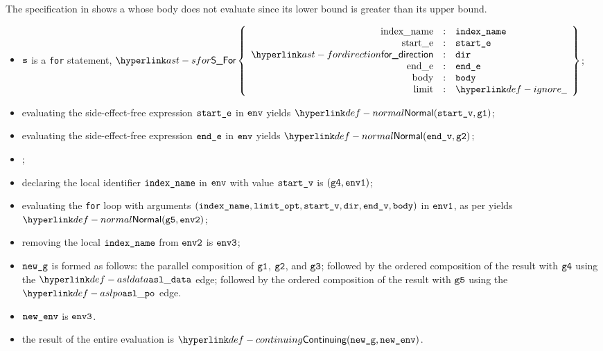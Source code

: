 The specification in  shows a \forstatementterm{}
whose body does not evaluate since its lower bound is greater than its upper bound.

\ProseParagraph
\AllApply
\begin{itemize}
  \item $\texttt{s}$ is a \texttt{for} statement, $\SFor\left\{\begin{array}{rcl}
    \Forindexname &:& \vindexname\\
    \Forstarte &:& \vstarte\\
    \fordirection &:& \vdir\\
    \Forende &:& \vende\\
    \Forbody &:& \vbody\\
    \Forlimit &:& \Ignore
  \end{array}\right\}$;
  \item evaluating the side-effect-free expression $\texttt{start\_e}$ in $\env$ yields
        $\Normal(\vstartv, \vgone)$\ProseOrError;
  \item evaluating the side-effect-free expression $\texttt{end\_e}$ in $\env$ yields
        $\Normal(\vendv, \vgtwo)$\ProseOrError;
  \item \Proseevallimit{$\env$}{$\velimitopt$}{$\Normal(\vlimitopt, \vgthree)$}\ProseOrError;
  \item declaring the local identifier $\texttt{index\_name}$ in $\env$ with value $\texttt{start\_v}$ is $(\texttt{g4}, \texttt{env1})$;
  \item evaluating the \texttt{for} loop with arguments $(\texttt{index\_name}, \texttt{limit\_opt}, \texttt{start\_v}, \texttt{dir}, \texttt{end\_v}, \texttt{body})$ in $\texttt{env1}$,
        as per  yields $\Normal(\vgfive, \envtwo)$\ProseOrAbnormal;
  \item removing the local $\texttt{index\_name}$ from $\texttt{env2}$ is $\texttt{env3}$;
  \item $\texttt{new\_g}$ is formed as follows:
        the parallel composition of $\texttt{g1}$, $\texttt{g2}$, and $\texttt{g3}$;
        followed by the ordered composition of the result with $\texttt{g4}$ using the $\asldata$ edge;
        followed by the ordered composition of the result with $\texttt{g5}$ using the $\aslpo$ edge.
  \item $\texttt{new\_env}$ is $\texttt{env3}$.
  \item the result of the entire evaluation is $\Continuing(\newg, \newenv)$.
\end{itemize}

